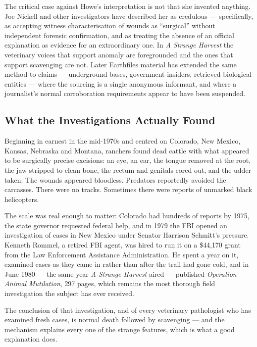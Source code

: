 The critical case against Howe's interpretation is not that she invented anything.  Joe Nickell
and other investigators have described her as credulous --- specifically, as accepting witness
characterisation of wounds as ``surgical'' without independent forensic confirmation, and as
treating the absence of an official explanation as evidence for an extraordinary one. In
\emph{A Strange Harvest} the veterinary voices that support anomaly are foregrounded and the ones
that support scavenging are not. Later Earthfiles material has extended the same method to
claims --- underground bases, government insiders, retrieved biological entities --- where the
sourcing is a single anonymous informant, and where a journalist's normal corroboration
requirements appear to have been suspended.

\subsection{What the Investigations Actually Found}

Beginning in earnest in the mid-1970s and centred on Colorado, New Mexico, Kansas, Nebraska and
Montana, ranchers found dead cattle with what appeared to be surgically precise excisions: an
eye, an ear, the tongue removed at the root, the jaw stripped to clean bone, the rectum and
genitals cored out, and the udder taken. The wounds appeared bloodless. Predators reportedly
avoided the carcasses. There were no tracks. Sometimes there were reports of unmarked black
helicopters.

The scale was real enough to matter: Colorado had hundreds of reports by 1975, the state
governor requested federal help, and in 1979 the FBI opened an investigation of cases in New
Mexico under Senator Harrison Schmitt's pressure. Kenneth Rommel, a retired FBI agent, was hired
to run it on a \$44{,}170 grant from the Law Enforcement Assistance Administration. He spent a
year on it, examined cases as they came in rather than after the trail had gone cold, and in June
1980 --- the same year \emph{A Strange Harvest} aired --- published \emph{Operation Animal
Mutilation}, 297 pages, which remains the most thorough field investigation the subject has ever
received.

The conclusion of that investigation, and of every veterinary pathologist who has examined fresh
cases, is normal death followed by scavenging --- and the mechanism explains every one of the
strange features, which is what a good explanation does.

